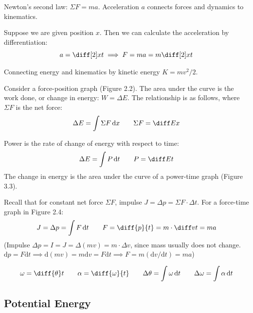 \documentclass{article}
\newcommand{\theorem}[2]{\begin{tcolorbox}[title={#1},colback=blue!5!white,colframe=blue!75!black,parbox=false] #2 \end{tcolorbox}}
\begin{document}
\theorem{Connecting dynamics/forces and kinematics}{
Newton's second law: $\Sigma F=ma$. Acceleration $a$ connects forces and dynamics to kinematics.

Suppose we are given position $x$. Then we can calculate the acceleration by differentiation:
\begin{equation*}
	a=\diff[2]xt
	\implies F=ma=m\diff[2]xt
\end{equation*}
}

Connecting energy and kinematics by kinetic energy $K=mv^2/2$.

\theorem{Work and force-position graphs}{
	Consider a force-position graph (Figure 2.2). The area under the curve is the work done, or change in energy: $W=\Delta E$. The relationship is as follows, where $\Sigma F$ is the net force:
	\begin{equation*}
	    \Delta E=\int\Sigma  F\,\mathrm{d}x
		\qquad \Sigma F=\diff Ex
	\end{equation*}
}

\theorem{Power and time}{
	Power is the rate of change of energy with respect to time:
	\begin{equation*}
		\Delta E=\int P\,\mathrm{d}t \qquad P=\diff Et
	\end{equation*}
	The change in energy is the area under the curve of a power-time graph (Figure 3.3).
}

\theorem{Force and time}{
	Recall that for constant net force $\Sigma F$, impulse $J=\Delta p=\Sigma F\cdot \Delta t$. For a force-time graph in Figure 2.4:
	\begin{equation*}
	    J=\Delta p=\int F\,\mathrm{d}t
		\qquad 
		F=\diff{p}{t}=m\cdot \diff vt=ma
	\end{equation*}
	(Impulse $\Delta p=I=J=\Delta(mv)=m \cdot \Delta v$, since mass usually does not change. $\mathrm{d}p=F\mathrm{d} t \implies \mathrm{d}(mv)=m\mathrm{d} v=F\mathrm{d} t\implies F=m(\mathrm{d}v/\mathrm{d}t)=ma$)
}

\theorem{Rotational kinematics}{
	\begin{equation*}
		\omega=\diff{\theta}t \qquad
		\alpha=\diff{\omega}{t} \qquad
		\Delta\theta=\int \omega\,\mathrm{d}t \qquad
		\Delta \omega=\int \alpha\,\mathrm{d}t
	\end{equation*}
}

\subsection{Potential Energy}
\end{document}
